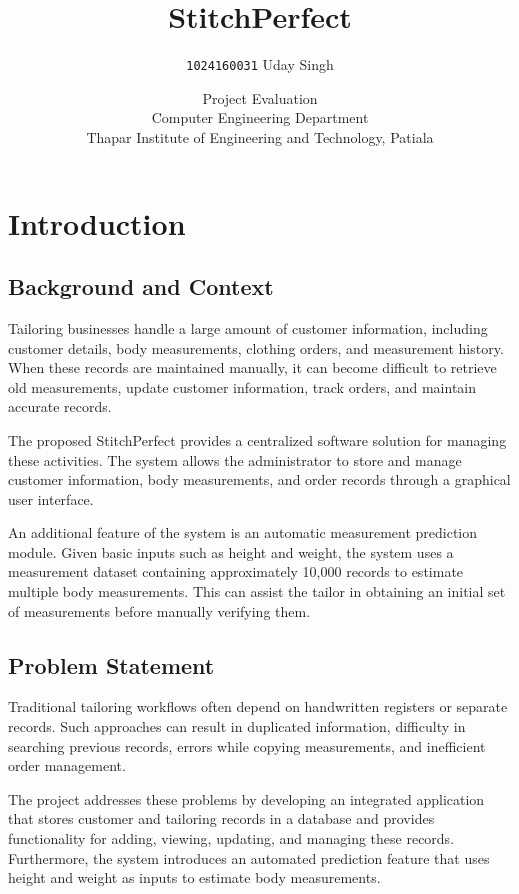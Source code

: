 \documentclass[12pt,a4paper]{report}
\title{StitchPerfect}
\author{\texttt{1024160031} Uday Singh}
\date{Project Evaluation\\[0.2cm]
Computer Engineering Department\\[0.2cm]
Thapar Institute of Engineering and Technology, Patiala}
\begin{document}
\maketitle

\tableofcontents


\chapter{Introduction}

\section{Background and Context}

Tailoring businesses handle a large amount of customer information, including
customer details, body measurements, clothing orders, and measurement history.
When these records are maintained manually, it can become difficult to retrieve
old measurements, update customer information, track orders, and maintain
accurate records.

The proposed StitchPerfect provides a
centralized software solution for managing these activities. The system allows
the administrator to store and manage customer information, body measurements,
and order records through a graphical user interface.

An additional feature of the system is an automatic measurement prediction
module. Given basic inputs such as height and weight, the system uses a
measurement dataset containing approximately 10,000 records to estimate
multiple body measurements. This can assist the tailor in obtaining an initial
set of measurements before manually verifying them.

\section{Problem Statement}

Traditional tailoring workflows often depend on handwritten registers or
separate records. Such approaches can result in duplicated information,
difficulty in searching previous records, errors while copying measurements,
and inefficient order management.

The project addresses these problems by developing an integrated application
that stores customer and tailoring records in a database and provides
functionality for adding, viewing, updating, and managing these records.
Furthermore, the system introduces an automated prediction feature that uses
height and weight as inputs to estimate body measurements.
\end{document}
